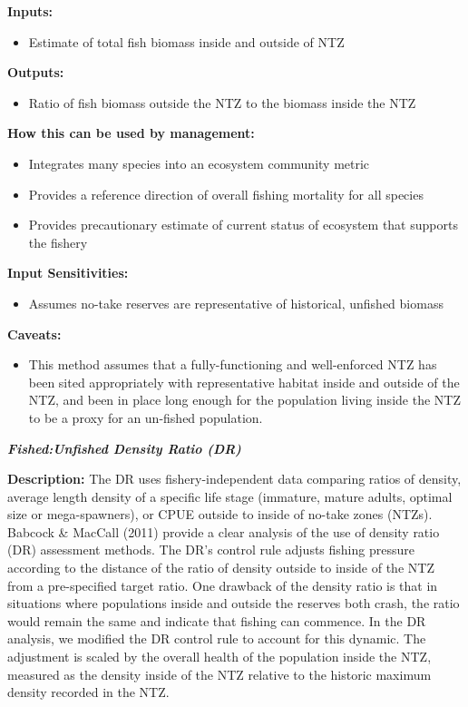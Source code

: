 \documentclass[]{book}
\providecommand{\tightlist}{%
  \setlength{\itemsep}{0pt}\setlength{\parskip}{0pt}}
\begin{document}
\textbf{Inputs:}

\begin{itemize}
\tightlist
\item
  Estimate of total fish biomass inside and outside of NTZ
\end{itemize}

\textbf{Outputs:}

\begin{itemize}
\tightlist
\item
  Ratio of fish biomass outside the NTZ to the biomass inside the NTZ
\end{itemize}

\textbf{How this can be used by management:}

\begin{itemize}
\item
  Integrates many species into an ecosystem community metric
\item
  Provides a reference direction of overall fishing mortality for all
  species
\item
  Provides precautionary estimate of current status of ecosystem that
  supports the fishery
\end{itemize}

\textbf{Input Sensitivities:}

\begin{itemize}
\tightlist
\item
  Assumes no-take reserves are representative of historical, unfished
  biomass
\end{itemize}

\textbf{Caveats:}

\begin{itemize}
\tightlist
\item
  This method assumes that a fully-functioning and well-enforced NTZ has
  been sited appropriately with representative habitat inside and
  outside of the NTZ, and been in place long enough for the population
  living inside the NTZ to be a proxy for an un-fished population.
\end{itemize}

\textbf{\emph{Fished:Unfished Density Ratio (DR)}}

\textbf{Description:} The DR uses fishery-independent data comparing
ratios of density, average length density of a specific life stage
(immature, mature adults, optimal size or mega-spawners), or CPUE
outside to inside of no-take zones (NTZs). Babcock \& MacCall (2011)
provide a clear analysis of the use of density ratio (DR) assessment
methods. The DR's control rule adjusts fishing pressure according to the
distance of the ratio of density outside to inside of the NTZ from a
pre-specified target ratio. One drawback of the density ratio is that in
situations where populations inside and outside the reserves both crash,
the ratio would remain the same and indicate that fishing can commence.
In the DR analysis, we modified the DR control rule to account for this
dynamic. The adjustment is scaled by the overall health of the
population inside the NTZ, measured as the density inside of the NTZ
relative to the historic maximum density recorded in the NTZ.
\end{document}

